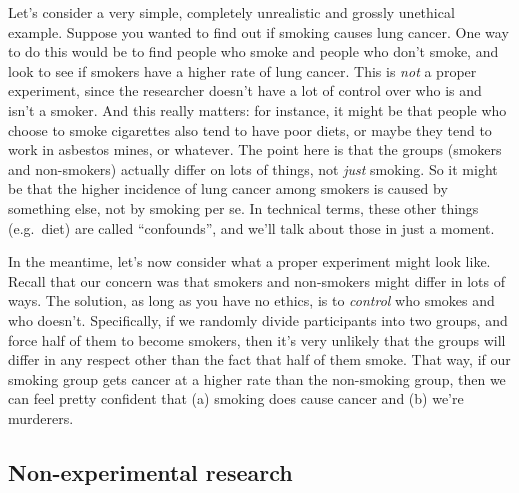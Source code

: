 \documentclass[]{book}
\begin{document}
Let's consider a very simple, completely unrealistic and grossly unethical example. Suppose you wanted to find out if smoking causes lung cancer. One way to do this would be to find people who smoke and people who don't smoke, and look to see if smokers have a higher rate of lung cancer. This is {\emph{not}} a proper experiment, since the researcher doesn't have a lot of control over who is and isn't a smoker. And this really matters: for instance, it might be that people who choose to smoke cigarettes also tend to have poor diets, or maybe they tend to work in asbestos mines, or whatever. The point here is that the groups (smokers and non-smokers) actually differ on lots of things, not {\emph{just}} smoking. So it might be that the higher incidence of lung cancer among smokers is caused by something else, not by smoking per se. In technical terms, these other things (e.g.~diet) are called ``confounds'', and we'll talk about those in just a moment.

In the meantime, let's now consider what a proper experiment might look like. Recall that our concern was that smokers and non-smokers might differ in lots of ways. The solution, as long as you have no ethics, is to {\emph{control}} who smokes and who doesn't. Specifically, if we randomly divide participants into two groups, and force half of them to become smokers, then it's very unlikely that the groups will differ in any respect other than the fact that half of them smoke. That way, if our smoking group gets cancer at a higher rate than the non-smoking group, then we can feel pretty confident that (a) smoking does cause cancer and (b) we're murderers.

\hypertarget{non-experimental-research}{%
\subsection{Non-experimental research}\label{non-experimental-research}}
\end{document}
